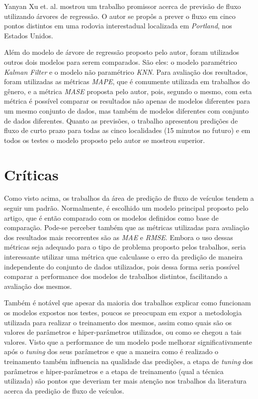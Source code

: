 Yanyan Xu et. al. \cite{xu2013short} mostrou um trabalho promissor acerca de previsão de fluxo utilizando árvores de regressão. O autor se propôs a prever o fluxo em cinco pontos distintos em uma rodovia interestadual localizada em \textit{Portland}, nos Estados Unidos.

Além do modelo de árvore de regressão proposto pelo autor, foram utilizados outros dois modelos para serem comparados. São eles: o modelo paramétrico \textit{Kalman Filter} e o modelo não paramétrico \textit{\acrfull{KNN}}. Para avaliação dos resultados, foram utilizadas as métricas \textit{\acrshort{MAPE}}, que é comumente utilizada em trabalhos do gênero, e a métrica \textit{\acrfull{MASE}} proposta pelo autor, pois, segundo o mesmo, com esta métrica é possível comparar os resultados não apenas de modelos diferentes para um mesmo conjunto de dados, mas também de modelos diferentes com conjunto de dados diferentes. 
Quanto as previsões, o trabalho apresentou predições de fluxo de curto prazo para todas as cinco localidades (15 minutos no futuro) e em todos os testes o modelo proposto pelo autor se mostrou superior. %

\section{Críticas}

Como visto acima, os trabalhos da área de predição de fluxo de veículos tendem a seguir um padrão. Normalmente, é escolhido um modelo principal proposto pelo artigo, que é então comparado com os modelos definidos como base de comparação. Pode-se perceber também que as métricas utilizadas para avaliação dos resultados mais recorrentes são as \textit{\acrshort{MAE}} e \textit{\acrshort{RMSE}}. Embora o uso dessas métricas seja adequado para o tipo de problema proposto pelos trabalhos, seria interessante utilizar uma métrica que calculasse o erro da predição de maneira independente do conjunto de dados utilizados, pois dessa forma seria possível comparar a performance dos modelos de trabalhos distintos, facilitando a avaliação dos mesmos.

Também é notável que apesar da maioria dos trabalhos explicar como funcionam os modelos expostos nos testes, poucos se preocupam em expor a metodologia utilizada para realizar o treinamento dos mesmos, assim como quais são os valores de parâmetros e hiper-parâmetros utilizados, ou como se chegou a tais valores. Visto que a performance de um modelo pode melhorar significativamente após o \textit{tuning} dos seus parâmetros e que a maneira como é realizado o treinamento também influencia na qualidade das predições, a etapa de \textit{tuning} dos parâmetros e hiper-parâmetros e a etapa de treinamento (qual a técnica utilizada) são pontos que deveriam ter mais atenção nos trabalhos da literatura acerca da predição de fluxo de veículos.